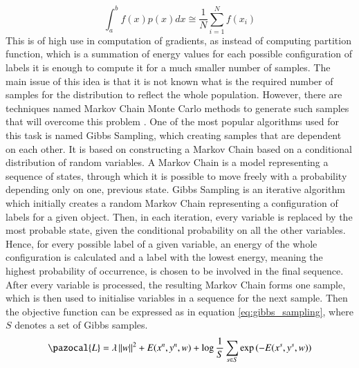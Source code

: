 \begin{equation}
    \int_{a}^{b}{f(x)p(x)dx} \cong \frac{1}{N}\sum_{i=1}^{N}{f(x_i)}
\end{equation}
This is of high use in computation of gradients, as instead of computing partition function, which is a summation of energy values for each possible configuration of labels it is enough to compute it for a much smaller number of samples. The main issue of this idea is that it is not known what is the required number of samples for the distribution to reflect the whole population. However, there are techniques named Markov Chain Monte Carlo methods to generate such samples that will overcome this problem \cite{markov_blake}. One of the most popular algorithms used for this task is named Gibbs Sampling, which creating samples that are dependent on each other. It is based on constructing a Markov Chain based on a conditional distribution of random variables. A Markov Chain is a model representing a sequence of states, through which it is possible to move freely with a probability depending only on one, previous state. Gibbs Sampling is an iterative algorithm which initially creates a random Markov Chain representing a configuration of labels for a given object. Then, in each iteration, every variable is replaced by the most probable state, given the conditional probability on all the other variables. Hence, for every possible label of a given variable, an energy of the whole configuration is calculated and a label with the lowest energy, meaning the highest probability of occurrence, is chosen to be involved in the final sequence. After every variable is processed, the resulting Markov Chain forms one sample, which is then used to initialise variables in a sequence for the next sample.  Then the objective function can be expressed as in equation \ref{eq:gibbs_sampling}, where $S$ denotes a set of Gibbs samples.
\begin{equation}
    \label{eq:gibbs_sampling}
    \pazocal{L} = \lambda \left \| w \right \|^2 + E(x^n,y^n,w) + \log{\frac{1}{S}\sum_{s \in S}{\exp{(-E(x^s,y^s,w))}}}
\end{equation}

